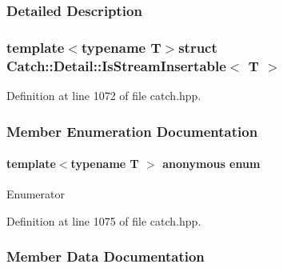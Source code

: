 \subsubsection{Detailed Description}
\subsubsection*{template$<$typename T$>$struct Catch\+::\+Detail\+::\+Is\+Stream\+Insertable$<$ T $>$}



Definition at line 1072 of file catch.\+hpp.



\subsubsection{Member Enumeration Documentation}
\hypertarget{a00043_a2e4508694da3bf368ff67733a7970edd}{}\paragraph[{anonymous enum}]{\setlength{\rightskip}{0pt plus 5cm}template$<$typename T $>$ anonymous enum}\label{a00043_a2e4508694da3bf368ff67733a7970edd}
\begin{Desc}
\item[Enumerator]\par
\begin{description}
\item[{\em 
\hypertarget{a00043_a2e4508694da3bf368ff67733a7970edda765a324929702bfce2969fc19fc4f926}{}value\label{a00043_a2e4508694da3bf368ff67733a7970edda765a324929702bfce2969fc19fc4f926}
}]\end{description}
\end{Desc}


Definition at line 1075 of file catch.\+hpp.



\subsubsection{Member Data Documentation}
\hypertarget{a00043_abe3d3c8e5d85665747faafffc9a96b00}{}

